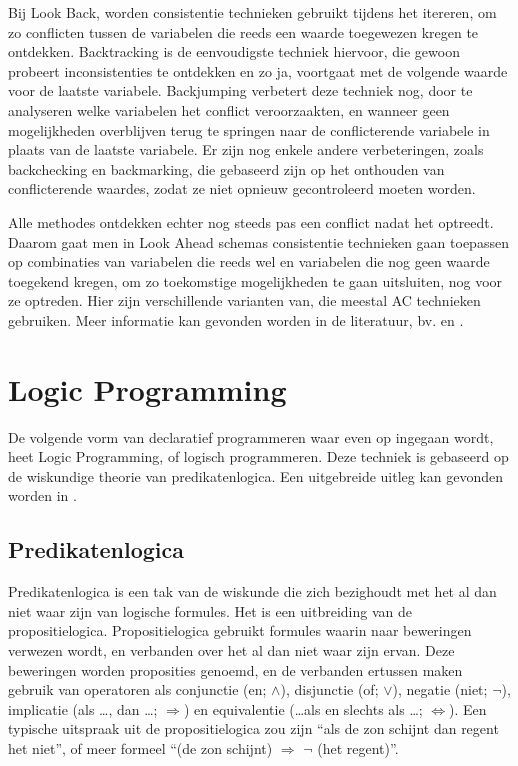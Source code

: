 Bij Look Back, worden consistentie technieken gebruikt tijdens het itereren, om zo conflicten tussen de variabelen die reeds een waarde toegewezen kregen te ontdekken. Backtracking is de eenvoudigste techniek hiervoor, die gewoon probeert inconsistenties te ontdekken en zo ja, voortgaat met de volgende waarde voor de laatste variabele. Backjumping verbetert deze techniek nog, door te analyseren welke variabelen het conflict veroorzaakten, en wanneer geen mogelijkheden overblijven terug te springen naar de conflicterende variabele in plaats van de laatste variabele. Er zijn nog enkele andere verbeteringen, zoals backchecking en backmarking, die gebaseerd zijn op het onthouden van conflicterende waardes, zodat ze niet opnieuw gecontroleerd moeten worden.

Alle methodes ontdekken echter nog steeds pas een conflict nadat het optreedt. Daarom gaat men in Look Ahead schemas consistentie technieken gaan toepassen op combinaties van variabelen die reeds wel en variabelen die nog geen waarde toegekend kregen, om zo toekomstige mogelijkheden te gaan uitsluiten, nog voor ze optreden. Hier zijn verschillende varianten van, die meestal AC technieken gebruiken. Meer informatie kan gevonden worden in de literatuur, bv. \cite{bartak01} en \cite{bartak99constraint}.

\section{Logic Programming}

De volgende vorm van declaratief programmeren waar even op ingegaan wordt, heet Logic Programming, of logisch programmeren. Deze techniek is gebaseerd op de wiskundige theorie van predikatenlogica. Een uitgebreide uitleg kan gevonden worden in \cite{introlp}.

\subsection{Predikatenlogica}

Predikatenlogica is een tak van de wiskunde die zich bezighoudt met het al dan niet waar zijn van logische formules. Het is een uitbreiding van de propositielogica. Propositielogica gebruikt formules waarin naar beweringen verwezen wordt, en verbanden over het al dan niet waar zijn ervan. Deze beweringen worden proposities genoemd, en de verbanden ertussen maken gebruik van operatoren als conjunctie (en; $\land$), disjunctie (of; $\lor$), negatie (niet; $\lnot$), implicatie (als \ldots, dan \ldots; $\Rightarrow$) en equivalentie (\ldots als en slechts als \ldots; $\Leftrightarrow$). Een typische uitspraak uit de propositielogica zou zijn ``als de zon schijnt dan regent het niet'', of meer formeel ``(de zon schijnt) $\Rightarrow$ $\lnot$ (het regent)''.

